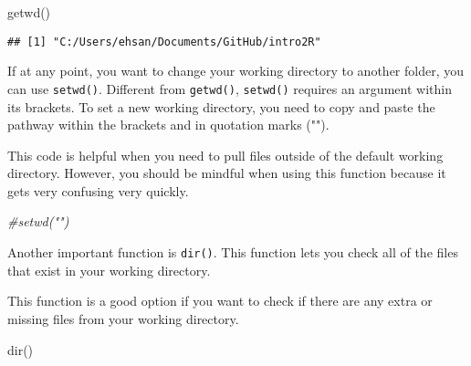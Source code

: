 \documentclass[
]{book}
\newenvironment{Shaded}{\begin{snugshade}}{\end{snugshade}}
\newcommand{\CommentTok}[1]{\textcolor[rgb]{0.56,0.35,0.01}{\textit{#1}}}
\newcommand{\FunctionTok}[1]{\textcolor[rgb]{0.00,0.00,0.00}{#1}}
\newcommand{\NormalTok}[1]{#1}
\begin{document}
\begin{Shaded}
\begin{Highlighting}[]
\FunctionTok{getwd}\NormalTok{()}
\end{Highlighting}
\end{Shaded}

\begin{verbatim}
## [1] "C:/Users/ehsan/Documents/GitHub/intro2R"
\end{verbatim}

If at any point, you want to change your working directory to another folder, you can use \texttt{setwd()}. Different from \texttt{getwd()}, \texttt{setwd()} requires an argument within its brackets. To set a new working directory, you need to copy and paste the pathway within the brackets and in quotation marks ("").

This code is helpful when you need to pull files outside of the default working directory. However, you should be mindful when using this function because it gets very confusing very quickly.

\begin{Shaded}
\begin{Highlighting}[]
\CommentTok{\#setwd("")}
\end{Highlighting}
\end{Shaded}

Another important function is \texttt{dir()}. This function lets you check all of the files that exist in your working directory.

This function is a good option if you want to check if there are any extra or missing files from your working directory.

\begin{Shaded}
\begin{Highlighting}[]
\FunctionTok{dir}\NormalTok{()}
\end{Highlighting}
\end{Shaded}
\end{document}
